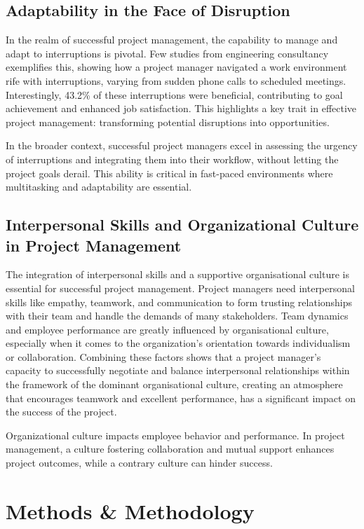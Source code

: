 \documentclass{article}
\begin{document}
\subsection{Adaptability in the Face of Disruption}
In the realm of successful project management, the capability to manage and adapt to interruptions is pivotal. Few studies from engineering consultancy exemplifies this, showing how a project manager navigated a work environment rife with interruptions, varying from sudden phone calls to scheduled meetings. Interestingly, 43.2\% of these interruptions were beneficial, contributing to goal achievement and enhanced job satisfaction. This highlights a key trait in effective project management: transforming potential disruptions into opportunities.

In the broader context, successful project managers excel in assessing the urgency of interruptions and integrating them into their workflow, without letting the project goals derail. This ability is critical in fast-paced environments where multitasking and adaptability are essential.

\subsection{Interpersonal Skills and Organizational Culture in Project Management}
The integration of interpersonal skills and a supportive organisational culture is essential for successful project management. Project managers need interpersonal skills like empathy, teamwork, and communication to form trusting relationships with their team and handle the demands of many stakeholders. Team dynamics and employee performance are greatly influenced by organisational culture, especially when it comes to the organization's orientation towards individualism or collaboration. Combining these factors shows that a project manager's capacity to successfully negotiate and balance interpersonal relationships within the framework of the dominant organisational culture, creating an atmosphere that encourages teamwork and excellent performance, has a significant impact on the success of the project.

Organizational culture impacts employee behavior and performance. In project management, a culture fostering collaboration and mutual support enhances project outcomes, while a contrary culture can hinder success.


\section{Methods \& Methodology}
\end{document}
